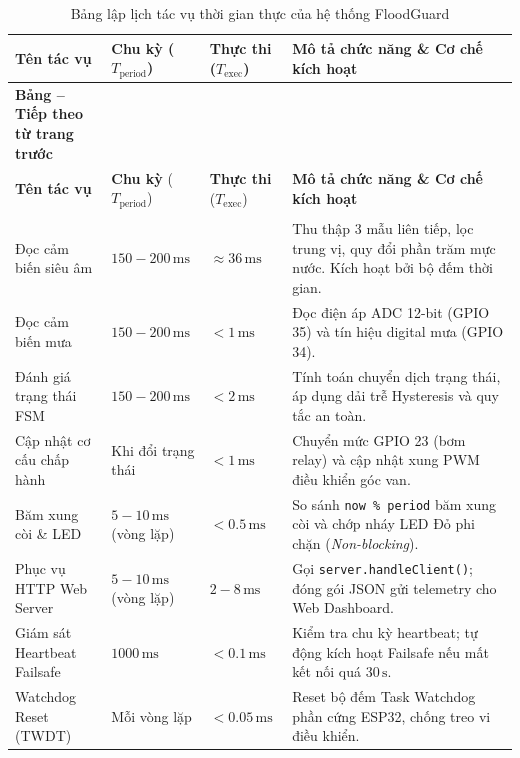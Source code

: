 \begingroup
\small
\renewcommand{\arraystretch}{1.2}
\begin{xltabular}{\textwidth}{|>{\raggedright\arraybackslash}p{3.5cm}|>{\centering\arraybackslash}p{2.2cm}|>{\centering\arraybackslash}p{1.8cm}|X|}
\caption{Bảng lập lịch tác vụ thời gian thực của hệ thống FloodGuard} \label{tab:task_scheduling} \\
\hline
\textbf{Tên tác vụ} & \textbf{Chu kỳ} ($T_{\text{period}}$) & \textbf{Thực thi} ($T_{\text{exec}}$) & \textbf{Mô tả chức năng \& Cơ chế kích hoạt} \\ \hline
\endfirsthead

%
{{\bfseries Bảng \thetable{} -- Tiếp theo từ trang trước}} \\
\hline
\textbf{Tên tác vụ} & \textbf{Chu kỳ} ($T_{\text{period}}$) & \textbf{Thực thi} ($T_{\text{exec}}$) & \textbf{Mô tả chức năng \& Cơ chế kích hoạt} \\ \hline
\endhead

\hline {} \\ \hline
\endfoot

\hline
\endlastfoot

Đọc cảm biến siêu âm & $150 - 200\,\text{ms}$ & $\approx 36\,\text{ms}$ & Thu thập 3 mẫu liên tiếp, lọc trung vị, quy đổi phần trăm mực nước. Kích hoạt bởi bộ đếm thời gian. \\ \hline
Đọc cảm biến mưa & $150 - 200\,\text{ms}$ & $< 1\,\text{ms}$ & Đọc điện áp ADC 12-bit (GPIO 35) và tín hiệu digital mưa (GPIO 34). \\ \hline
Đánh giá trạng thái FSM & $150 - 200\,\text{ms}$ & $< 2\,\text{ms}$ & Tính toán chuyển dịch trạng thái, áp dụng dải trễ Hysteresis và quy tắc an toàn. \\ \hline
Cập nhật cơ cấu chấp hành & Khi đổi trạng thái & $< 1\,\text{ms}$ & Chuyển mức GPIO 23 (bơm relay) và cập nhật xung PWM điều khiển góc van. \\ \hline
Băm xung còi \& LED & $5 - 10\,\text{ms}$ (vòng lặp) & $< 0.5\,\text{ms}$ & So sánh \texttt{now \% period} băm xung còi và chớp nháy LED Đỏ phi chặn (\textit{Non-blocking}). \\ \hline
Phục vụ HTTP Web Server & $5 - 10\,\text{ms}$ (vòng lặp) & $2 - 8\,\text{ms}$ & Gọi \texttt{server.handleClient()}; đóng gói JSON gửi telemetry cho Web Dashboard. \\ \hline
Giám sát Heartbeat Failsafe & $1000\,\text{ms}$ & $< 0.1\,\text{ms}$ & Kiểm tra chu kỳ heartbeat; tự động kích hoạt Failsafe nếu mất kết nối quá $30\,\text{s}$. \\ \hline
Watchdog Reset (TWDT) & Mỗi vòng lặp & $< 0.05\,\text{ms}$ & Reset bộ đếm Task Watchdog phần cứng ESP32, chống treo vi điều khiển. \\ \hline
\end{xltabular}
\endgroup

